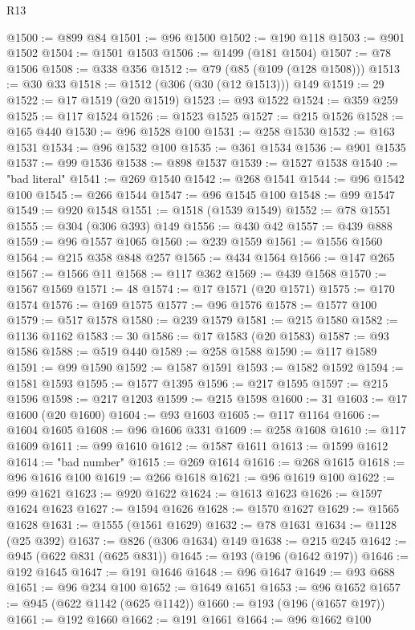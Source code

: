 \begin{lexlean}{R13}
\begin{coremodule}
@1500 := @899 @84
@1501 := @96 @1500
@1502 := @190 @118
@1503 := @901 @1502
@1504 := @1501 @1503
@1506 := @1499 (@181 @1504)
@1507 := @78 @1506
@1508 := @338 @356
@1512 := @79 (@85 (@109 (@128 @1508)))
@1513 := @30 @33
@1518 := @1512 (@306 (@30 (@12 @1513))) @149
@1519 := 29
@1522 := @17 @1519 (@20 @1519)
@1523 := @93 @1522
@1524 := @359 @259
@1525 := @117 @1524
@1526 := @1523 @1525
@1527 := @215 @1526
@1528 := @165 @440
@1530 := @96 @1528 @100
@1531 := @258 @1530
@1532 := @163 @1531
@1534 := @96 @1532 @100
@1535 := @361 @1534
@1536 := @901 @1535
@1537 := @99 @1536
@1538 := @898 @1537
@1539 := @1527 @1538
@1540 := "bad literal"
@1541 := @269 @1540
@1542 := @268 @1541
@1544 := @96 @1542 @100
@1545 := @266 @1544
@1547 := @96 @1545 @100
@1548 := @99 @1547
@1549 := @920 @1548
@1551 := @1518 (@1539 @1549)
@1552 := @78 @1551
@1555 := @304 (@306 @393) @149
@1556 := @430 @42
@1557 := @439 @888
@1559 := @96 @1557 @1065
@1560 := @239 @1559
@1561 := @1556 @1560
@1564 := @215 @358 @848 @257
@1565 := @434 @1564
@1566 := @147 @265
@1567 := @1566 @11
@1568 := @117 @362
@1569 := @439 @1568
@1570 := @1567 @1569
@1571 := 48
@1574 := @17 @1571 (@20 @1571)
@1575 := @170 @1574
@1576 := @169 @1575
@1577 := @96 @1576
@1578 := @1577 @100
@1579 := @517 @1578
@1580 := @239 @1579
@1581 := @215 @1580
@1582 := @1136 @1162
@1583 := 30
@1586 := @17 @1583 (@20 @1583)
@1587 := @93 @1586
@1588 := @519 @440
@1589 := @258 @1588
@1590 := @117 @1589
@1591 := @99 @1590
@1592 := @1587 @1591
@1593 := @1582 @1592
@1594 := @1581 @1593
@1595 := @1577 @1395
@1596 := @217 @1595
@1597 := @215 @1596
@1598 := @217 @1203
@1599 := @215 @1598
@1600 := 31
@1603 := @17 @1600 (@20 @1600)
@1604 := @93 @1603
@1605 := @117 @1164
@1606 := @1604 @1605
@1608 := @96 @1606 @331
@1609 := @258 @1608
@1610 := @117 @1609
@1611 := @99 @1610
@1612 := @1587 @1611
@1613 := @1599 @1612
@1614 := "bad number"
@1615 := @269 @1614
@1616 := @268 @1615
@1618 := @96 @1616 @100
@1619 := @266 @1618
@1621 := @96 @1619 @100
@1622 := @99 @1621
@1623 := @920 @1622
@1624 := @1613 @1623
@1626 := @1597 @1624 @1623
@1627 := @1594 @1626
@1628 := @1570 @1627
@1629 := @1565 @1628
@1631 := @1555 (@1561 @1629)
@1632 := @78 @1631
@1634 := @1128 (@25 @392)
@1637 := @826 (@306 @1634) @149
@1638 := @215 @245
@1642 := @945 (@622 @831 (@625 @831))
@1645 := @193 (@196 (@1642 @197))
@1646 := @192 @1645
@1647 := @191 @1646
@1648 := @96 @1647
@1649 := @93 @688
@1651 := @96 @234 @100
@1652 := @1649 @1651
@1653 := @96 @1652
@1657 := @945 (@622 @1142 (@625 @1142))
@1660 := @193 (@196 (@1657 @197))
@1661 := @192 @1660
@1662 := @191 @1661
@1664 := @96 @1662 @100

\end{coremodule}
\end{lexlean}
